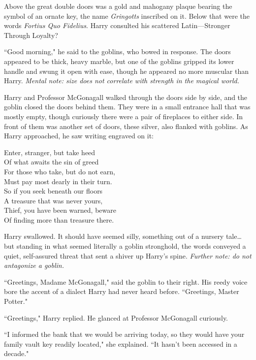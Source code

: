 Above the great double doors was a gold and mahogany plaque bearing the symbol of an ornate key, the name \emph{Gringotts} inscribed on it. Below that were the words \emph{Fortius Quo Fidelius}. Harry consulted his scattered Latin---Stronger Through Loyalty?

``Good morning," he said to the goblins, who bowed in response. The doors appeared to be thick, heavy marble, but one of the goblins gripped its lower handle and swung it open with ease, though he appeared no more muscular than Harry. \emph{Mental note: size does not correlate with strength in the magical world.}

Harry and Professor McGonagall walked through the doors side by side, and the goblin closed the doors behind them. They were in a small entrance hall that was mostly empty, though curiously there were a pair of fireplaces to either side. In front of them was another set of doors, these silver, also flanked with goblins. As Harry approached, he saw writing engraved on it:

\begin{inscription}
\begin{samepage}
Enter, stranger, but take heed\\
Of what awaits the sin of greed\\
For those who take, but do not earn,\\
Must pay most dearly in their turn.\\
So if you seek beneath our floors\\
A treasure that was never yours,\\
Thief, you have been warned, beware\\
Of finding more than treasure there.
\end{samepage}
\end{inscription}

Harry swallowed. It should have seemed silly, something out of a nursery tale{\ldots} but standing in what seemed literally a goblin stronghold, the words conveyed a quiet, self-assured threat that sent a shiver up Harry's spine. \emph{Further note: do not antagonize a goblin.}

``Greetings, Madame McGonagall," said the goblin to their right. His reedy voice bore the accent of a dialect Harry had never heard before. ``Greetings, Master Potter."

``Greetings," Harry replied. He glanced at Professor McGonagall curiously.

``I informed the bank that we would be arriving today, so they would have your family vault key readily located," she explained. ``It hasn't been accessed in a decade."

